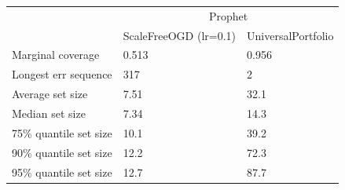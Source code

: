 \begin{tabular}{lll}
\toprule
& \multicolumn{2}{c}{Prophet} \\
& ScaleFreeOGD (lr=0.1) & UniversalPortfolio \\
\midrule
Marginal coverage & 0.513 & 0.956 \\
Longest err sequence & 317 & 2 \\
Average set size & 7.51 & 32.1 \\
Median set size & 7.34 & 14.3 \\
75\% quantile set size & 10.1 & 39.2 \\
90\% quantile set size & 12.2 & 72.3 \\
95\% quantile set size & 12.7 & 87.7 \\
\bottomrule
\end{tabular}
